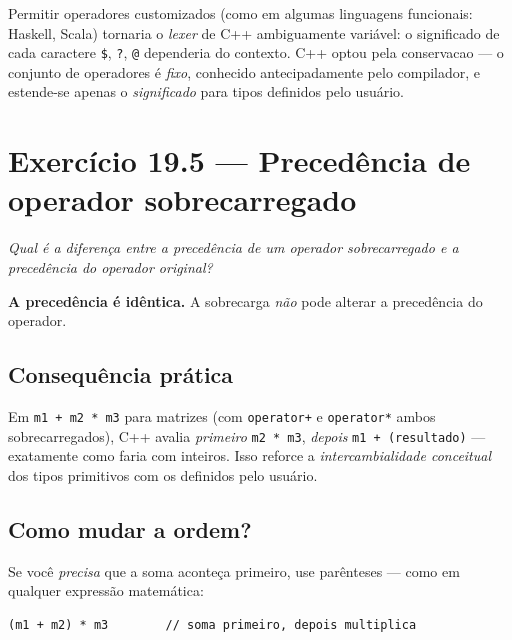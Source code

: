 \documentclass[11pt,a4paper]{article}
\begin{document}
\begin{obseng}
Permitir operadores customizados (como em algumas linguagens funcionais: Haskell, Scala) tornaria o \emph{lexer} de C++ ambiguamente vari\'avel: o significado de cada caractere \texttt{\$}, \texttt{?}, \texttt{@} dependeria do contexto. C++ optou pela conservacao --- o conjunto de operadores \'e \emph{fixo}, conhecido antecipadamente pelo compilador, e estende-se apenas o \emph{significado} para tipos definidos pelo usu\'ario.
\end{obseng}

\section{Exerc\'icio 19.5 --- Preced\^encia de operador sobrecarregado}

\textit{Qual \'e a diferen\c{c}a entre a preced\^encia de um operador sobrecarregado e a preced\^encia do operador original?}

\begin{resposta}
\textbf{A preced\^encia \'e id\^entica.} A sobrecarga \emph{n\~ao} pode alterar a preced\^encia do operador.
\end{resposta}

\subsection*{Consequ\^encia pr\'atica}

Em \texttt{m1 + m2 * m3} para matrizes (com \texttt{operator+} e \texttt{operator*} ambos sobrecarregados), C++ avalia \emph{primeiro} \texttt{m2 * m3}, \emph{depois} \texttt{m1 + (resultado)} --- exatamente como faria com inteiros. Isso reforce a \emph{intercambialidade conceitual} dos tipos primitivos com os definidos pelo usu\'ario.

\subsection*{Como mudar a ordem?}

Se voc\^e \emph{precisa} que a soma aconte\c{c}a primeiro, use par\^enteses --- como em qualquer express\~ao matem\'atica:

\begin{lstlisting}[style=cppcode,numbers=none]
(m1 + m2) * m3        // soma primeiro, depois multiplica
\end{lstlisting}
\end{document}

